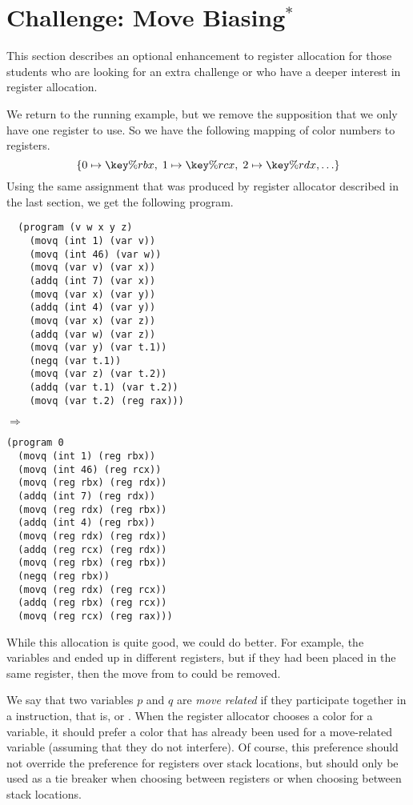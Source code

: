 \documentclass[11pt]{book}
\begin{document}
\section{Challenge: Move Biasing$^{*}$}
\label{sec:move-biasing}

This section describes an optional enhancement to register allocation
for those students who are looking for an extra challenge or who have
a deeper interest in register allocation.

We return to the running example, but we remove the supposition that
we only have one register to use. So we have the following mapping of
color numbers to registers.
\[
  \{ 0 \mapsto \key{\%rbx}, \; 1 \mapsto \key{\%rcx}, \; 2 \mapsto \key{\%rdx}, \ldots \}
\]
Using the same assignment that was produced by register allocator
described in the last section, we get the following program.

\begin{minipage}{0.45\textwidth}
\begin{lstlisting}
  (program (v w x y z)
    (movq (int 1) (var v))
    (movq (int 46) (var w))
    (movq (var v) (var x))
    (addq (int 7) (var x))
    (movq (var x) (var y))
    (addq (int 4) (var y))
    (movq (var x) (var z))
    (addq (var w) (var z))
    (movq (var y) (var t.1))
    (negq (var t.1))
    (movq (var z) (var t.2))
    (addq (var t.1) (var t.2))
    (movq (var t.2) (reg rax)))
\end{lstlisting}
\end{minipage}
$\Rightarrow$
\begin{minipage}{0.45\textwidth}
\begin{lstlisting}
(program 0
  (movq (int 1) (reg rbx))
  (movq (int 46) (reg rcx))
  (movq (reg rbx) (reg rdx))
  (addq (int 7) (reg rdx))
  (movq (reg rdx) (reg rbx))
  (addq (int 4) (reg rbx))
  (movq (reg rdx) (reg rdx))
  (addq (reg rcx) (reg rdx))
  (movq (reg rbx) (reg rbx))
  (negq (reg rbx))
  (movq (reg rdx) (reg rcx))
  (addq (reg rbx) (reg rcx))
  (movq (reg rcx) (reg rax)))
\end{lstlisting}
\end{minipage}

While this allocation is quite good, we could do better. For example,
the variables  and  ended up in different registers, but
if they had been placed in the same register, then the move from
 to  could be removed.

We say that two variables $p$ and $q$ are \emph{move related} if they
participate together in a  instruction, that is,  or . When the register allocator chooses a
color for a variable, it should prefer a color that has already been
used for a move-related variable (assuming that they do not
interfere). Of course, this preference should not override the
preference for registers over stack locations, but should only be used
as a tie breaker when choosing between registers or when choosing
between stack locations.
\end{document}
